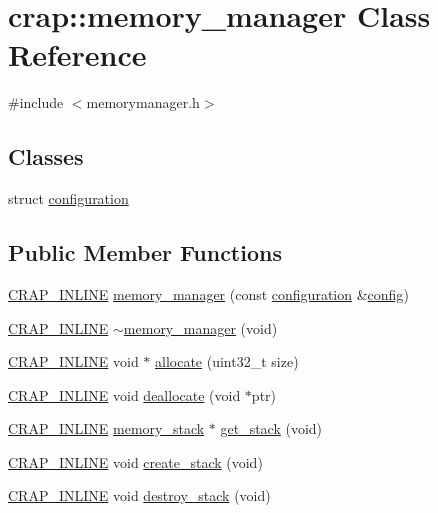 \hypertarget{classcrap_1_1memory__manager}{\section{crap\+:\+:memory\+\_\+manager Class Reference}
\label{classcrap_1_1memory__manager}
}


{\ttfamily \#include $<$memorymanager.\+h$>$}

\subsection*{Classes}
\begin{DoxyCompactItemize}
\item 
struct \hyperlink{structcrap_1_1memory__manager_1_1configuration}{configuration}
\end{DoxyCompactItemize}
\subsection*{Public Member Functions}
\begin{DoxyCompactItemize}
\item 
\hyperlink{config__x86_8h_a5a40526b8d842e7ff731509998bb0f1c}{C\+R\+A\+P\+\_\+\+I\+N\+L\+I\+N\+E} \hyperlink{classcrap_1_1memory__manager_a93051d0ffc02d2ab63a57b2017f09d3a}{memory\+\_\+manager} (const \hyperlink{structcrap_1_1memory__manager_1_1configuration}{configuration} \&\hyperlink{unittests_2source_2configuration_8cpp_ab299729ec441e3eaf9b96a1eb763e02f}{config})
\item 
\hyperlink{config__x86_8h_a5a40526b8d842e7ff731509998bb0f1c}{C\+R\+A\+P\+\_\+\+I\+N\+L\+I\+N\+E} \hyperlink{classcrap_1_1memory__manager_ada901cbb868877d6d9af948281d24f07}{$\sim$memory\+\_\+manager} (void)
\item 
\hyperlink{config__x86_8h_a5a40526b8d842e7ff731509998bb0f1c}{C\+R\+A\+P\+\_\+\+I\+N\+L\+I\+N\+E} void $\ast$ \hyperlink{classcrap_1_1memory__manager_aae41530d552578aa6d78ffec96dec69e}{allocate} (uint32\+\_\+t size)
\item 
\hyperlink{config__x86_8h_a5a40526b8d842e7ff731509998bb0f1c}{C\+R\+A\+P\+\_\+\+I\+N\+L\+I\+N\+E} void \hyperlink{classcrap_1_1memory__manager_a3c6568f92b8a533287697480b702e285}{deallocate} (void $\ast$ptr)
\item 
\hyperlink{config__x86_8h_a5a40526b8d842e7ff731509998bb0f1c}{C\+R\+A\+P\+\_\+\+I\+N\+L\+I\+N\+E} \hyperlink{classcrap_1_1memory__stack}{memory\+\_\+stack} $\ast$ \hyperlink{classcrap_1_1memory__manager_a4bdb547c679ac3549ff4f53d308c24d4}{get\+\_\+stack} (void)
\item 
\hyperlink{config__x86_8h_a5a40526b8d842e7ff731509998bb0f1c}{C\+R\+A\+P\+\_\+\+I\+N\+L\+I\+N\+E} void \hyperlink{classcrap_1_1memory__manager_a3a23f795ece223dfad4bc89af91c6743}{create\+\_\+stack} (void)
\item 
\hyperlink{config__x86_8h_a5a40526b8d842e7ff731509998bb0f1c}{C\+R\+A\+P\+\_\+\+I\+N\+L\+I\+N\+E} void \hyperlink{classcrap_1_1memory__manager_a482f48449775ae5fd889881ccfb61d08}{destroy\+\_\+stack} (void)
\end{DoxyCompactItemize}


